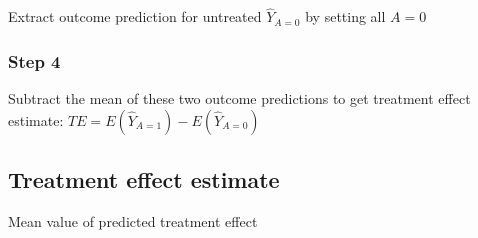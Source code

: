 \documentclass[
]{book}
\newenvironment{Shaded}{\begin{snugshade}}{\end{snugshade}}
\newcommand{\AttributeTok}[1]{\textcolor[rgb]{0.77,0.63,0.00}{#1}}
\newcommand{\DecValTok}[1]{\textcolor[rgb]{0.00,0.00,0.81}{#1}}
\newcommand{\FunctionTok}[1]{\textcolor[rgb]{0.00,0.00,0.00}{#1}}
\newcommand{\NormalTok}[1]{#1}
\newcommand{\OtherTok}[1]{\textcolor[rgb]{0.56,0.35,0.01}{#1}}
\newcommand{\SpecialCharTok}[1]{\textcolor[rgb]{0.00,0.00,0.00}{#1}}
\newcommand{\StringTok}[1]{\textcolor[rgb]{0.31,0.60,0.02}{#1}}
\begin{document}
Extract outcome prediction for untreated \(\hat{Y}_{A=0}\) by setting all \(A=0\)

\begin{Shaded}
\end{Shaded}

\hypertarget{step-4}{%
\subsubsection{Step 4}\label{step-4}}

Subtract the mean of these two outcome predictions to get treatment effect estimate: \(TE = E(\hat{Y}_{A=1}) - E(\hat{Y}_{A=0})\)

\begin{Shaded}
\end{Shaded}

\hypertarget{treatment-effect-estimate}{%
\subsection{Treatment effect estimate}\label{treatment-effect-estimate}}

Mean value of predicted treatment effect

\begin{Shaded}
\end{Shaded}
\end{document}
